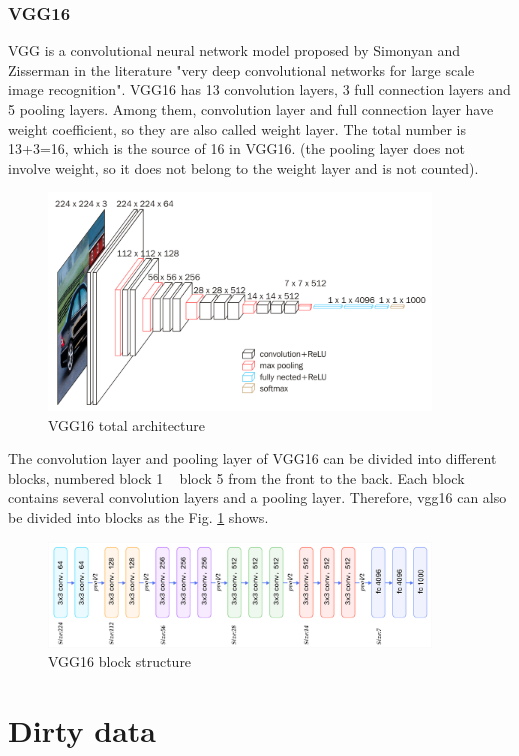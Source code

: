 \documentclass[runningheads]{llncs}
\begin{document}
\subsubsection{VGG16}
VGG is a convolutional neural network model proposed by Simonyan and Zisserman in the literature "very deep convolutional networks for large scale image recognition"\cite{m4}. VGG16 has 13 convolution layers, 3 full connection layers and 5 pooling layers. Among them, convolution layer and full connection layer have weight coefficient, so they are also called weight layer. The total number is 13+3=16, which is the source of 16 in VGG16. (the pooling layer does not involve weight, so it does not belong to the weight layer and is not counted).
\begin{figure}
	\centering
	\includegraphics[width=4.0in]{figures/vgg.png}
	\caption{VGG16 total architecture}
\end{figure}

The convolution layer and pooling layer of VGG16 can be divided into different blocks, numbered block 1 ~ block 5 from the front to the back. Each block contains several convolution layers and a pooling layer. Therefore, vgg16 can also be divided into blocks as the Fig. \ref{vgg2} shows.

\begin{figure}
	\centering
	\includegraphics[width=4.0in]{figures/vgg2.png}
	\caption{VGG16 block structure}
	\label{vgg2}
\end{figure}


\section{Dirty data}\label{generate method}
\end{document}
